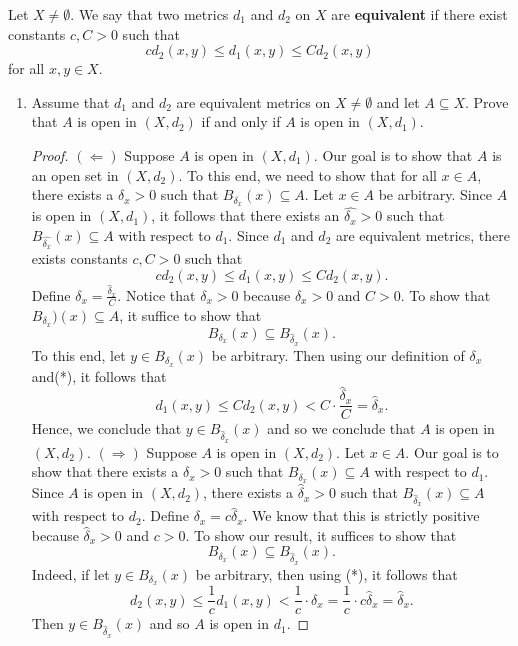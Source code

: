 \documentclass[a4paper]{article}
\begin{document}
\begin{problem}
    Let \( X \neq \emptyset  \). We say that two metrics \( {d}_{1} \) and \( {d}_{2} \) on \( X  \) are \textbf{equivalent} if there exist constants \( c,C > 0\) such that 
    \[  c {d}_{2}(x,y) \leq {d}_{1}(x,y) \leq C {d}_{2}(x,y) \]
    for all \( x,y \in X  \).
    \begin{enumerate}
        \item[(i)] Assume that \( {d}_{1} \) and \( {d}_{2} \) are equivalent metrics on \( X \neq \emptyset \) and let \( A \subseteq X  \). Prove that \( A  \) is open in \( (X,{d}_{2}) \) if and only if \( A  \) is open in \( (X,{d}_{1}) \).
            \begin{proof}
                \(  (\Longleftarrow) \) Suppose \( A  \) is open in \( (X,{d}_{1}) \). Our goal is to show that \( A  \) is an open set in \( (X, {d}_{2}) \). To this end, we need to show that for all \( x \in A  \), there exists a \( {\delta}_{x} > 0  \) such that \( {B}_{{\delta}_{x}}(x) \subseteq A  \). Let \( x \in A  \) be arbitrary. Since \( A  \) is open in \( (X,{d}_{1}) \), it follows that there exists an \( \hat{\delta_x} > 0  \) such that \( {B}_{\hat{\delta_x}}(x) \subseteq A   \) with respect to \( {d}_{1} \). Since \( {d}_{1} \) and \( {d}_{2}  \) are equivalent metrics, there exists constants \( c , C  > 0  \) such that 
                \[  c {d}_{2}(x,y) \leq {d}_{1}(x,y) \leq C {d}_{2}(x,y). \tag{*} \]
    Define \( {\delta}_{x} = \frac{ \hat{\delta}_x }{C}  \). Notice that \( {\delta}_{x} > 0 \) because \( {\hat{\delta}}_{x} > 0  \) and \( C > 0  \). To show that \( {B}_{{\delta}_{x}})(x) \subseteq A  \), it suffice to show that 
    \[  {B}_{\delta_x}(x) \subseteq {B}_{{\hat{\delta}}_{x}}(x).  \]
    To this end, let \( y \in {B}_{{\delta}_{x}}(x)  \) be arbitrary. Then using our definition of \( {\delta}_{x} \) and(*), it follows that   
    \[  {d}_{1}(x,y) \leq C {d}_{2}(x,y) < C \cdot \frac{ \hat{\delta}_x }{ C }  = \hat{\delta}_x. \]
    Hence, we conclude that \( y \in {B}_{\hat{\delta}_x}(x) \) and so we conclude that \( A  \) is open in \( (X,{d}_{2}) \). 
    \( (\Longrightarrow) \) Suppose \( A  \) is open in \( (X,{d}_{2}) \). Let \( x \in A  \). Our goal is to show that there exists a \( {\delta}_{x} > 0  \) such that \( {B}_{{\delta}_{x}}(x) \subseteq A \) with respect to \( {d}_{1} \). Since \( A  \) is open in \( (X,{d}_{2}) \), there exists a \( {\hat{\delta}}_{x} > 0  \) such that \( {B}_{\hat{\delta}_x}(x) \subseteq A   \) with respect to \( {d}_{2} \). Define \( {\delta}_{x} = c \hat{\delta}_x  \). We know that this is strictly positive because \( {\hat{\delta}}_{x}  > 0  \) and \( c > 0  \). To show our result, it suffices to show that 
    \[  {B}_{{\delta}_{x}}(x) \subseteq {B}_{{\hat{\delta}}_{x}}(x). \]
Indeed, if let \( y \in {B}_{{\delta}_{x}}(x)  \) be arbitrary, then using (*), it follows that
    \[  {d}_{2}(x,y) \leq \frac{ 1 }{ c }  {d}_{1}(x,y) < \frac{ 1 }{ c }  \cdot {\delta}_{x} = \frac{ 1 }{ c }  \cdot c \hat{\delta}_x = \hat{\delta}_x. \]
    Then \( y \in {B}_{\hat{\delta}_x}(x) \) and so \( A  \) is open in \( {d}_{1} \).


\end{proof}
\end{enumerate}
\end{problem}
\end{document}
